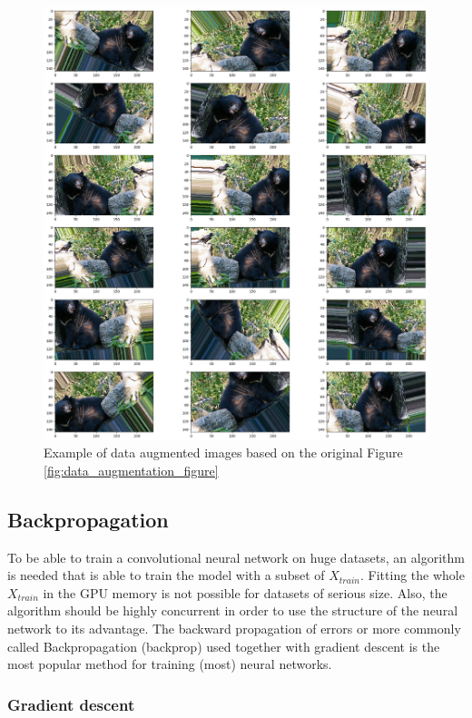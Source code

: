 \documentclass[times, utf8, diplomski]{fer}
\begin{document}
\begin{figure}
  \includegraphics[scale=0.35]{figures/da1.png}
  \centering
  \caption{Example of data augmented images based on the original Figure \ref{fig:data_augmentation_figure}}
  \label{fig:data_augmentation}
\end{figure}

\subsection{Backpropagation} \label{se:backprop}

To be able to train a convolutional neural network on huge datasets, an algorithm is needed that is able to train the model with a subset of $X_{train}$. Fitting the whole $X_{train}$ in the GPU memory is not possible for datasets of serious size. Also, the algorithm should be highly concurrent in order to use the structure of the neural network to its advantage. The backward propagation of errors or more commonly called Backpropagation (backprop) used together with gradient descent is the most popular method for training (most) neural networks.

\subsubsection{Gradient descent}
\end{document}
